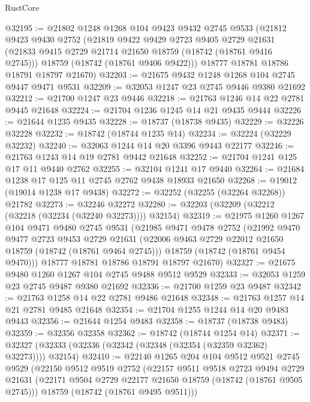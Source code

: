 \begin{lexlean}{RustCore}
\begin{coremodule}
@32195 := @21802
    @1248
    @1268
    @104
    @9423
    @9432
    @2745
    @9533
    (@21812
      @9423
      @9430
      @2752
      (@21819
        @9422
        @9429
        @2723
        @9405
        @2729
        @21631
        (@21833 @9415 @2729 @21714 @21650 @18759 (@18742 (@18761 @9416 @2745)))
        @18759
        (@18742 (@18761 @9406 @9422)))
      @18777
      @18781
      @18786
      @18791
      @18797
      @21670)
@32203 := @21675 @9432 @1248 @1268 @104 @2745 @9447 @9471 @9531
@32209 := @32053 @1247 @23 @2745 @9446 @9380 @21692
@32212 := @21700 @1247 @23 @9446
@32218 := @21763 @1246 @14 @22 @2781 @9445 @21648
@32224 := @21704 @1236 @1245 @14 @21 @9435 @9444
@32226 := @21644 @1235 @9435
@32228 := @18737 (@18738 @9435)
@32229 := @32226 @32228
@32232 := @18742 (@18744 @1235 @14)
@32234 := @32224 (@32229 @32232)
@32240 := @32063 @1244 @14 @20 @3396 @9443 @22177
@32246 := @21763 @1243 @14 @19 @2781 @9442 @21648
@32252 := @21704 @1241 @125 @17 @11 @9440 @2762
@32255 := @32104 @1241 @17 @9440
@32264 := @21684 @1238 @17 @125 @11 @2745 @2762 @9438 @18933 @21650
@32268 := @19012 (@19014 @1238 @17 @9438)
@32272 := @32252 (@32255 (@32264 @32268)) @21782
@32273 := @32246 @32272
@32280 := @32203 (@32209 (@32212 (@32218 (@32234 (@32240 @32273)))) @32154)
@32319 := @21975
    @1260
    @1267
    @104
    @9471
    @9480
    @2745
    @9531
    (@21985
      @9471
      @9478
      @2752
      (@21992
        @9470
        @9477
        @2723
        @9453
        @2729
        @21631
        (@22006 @9463 @2729 @22012 @21650 @18759 (@18742 (@18761 @9464 @2745)))
        @18759
        (@18742 (@18761 @9454 @9470)))
      @18777
      @18781
      @18786
      @18791
      @18797
      @21670)
@32327 := @21675 @9480 @1260 @1267 @104 @2745 @9488 @9512 @9529
@32333 := @32053 @1259 @23 @2745 @9487 @9380 @21692
@32336 := @21700 @1259 @23 @9487
@32342 := @21763 @1258 @14 @22 @2781 @9486 @21648
@32348 := @21763 @1257 @14 @21 @2781 @9485 @21648
@32354 := @21704 @1255 @1244 @14 @20 @9483 @9443
@32356 := @21644 @1254 @9483
@32358 := @18737 (@18738 @9483)
@32359 := @32356 @32358
@32362 := @18742 (@18744 @1254 @14)
@32371 := @32327 (@32333 (@32336 (@32342 (@32348 (@32354 (@32359 @32362) @32273)))) @32154)
@32410 := @22140
    @1265
    @204
    @104
    @9512
    @9521
    @2745
    @9529
    (@22150
      @9512
      @9519
      @2752
      (@22157
        @9511
        @9518
        @2723
        @9494
        @2729
        @21631
        (@22171 @9504 @2729 @22177 @21650 @18759 (@18742 (@18761 @9505 @2745)))
        @18759
        (@18742 (@18761 @9495 @9511)))

\end{coremodule}
\end{lexlean}
